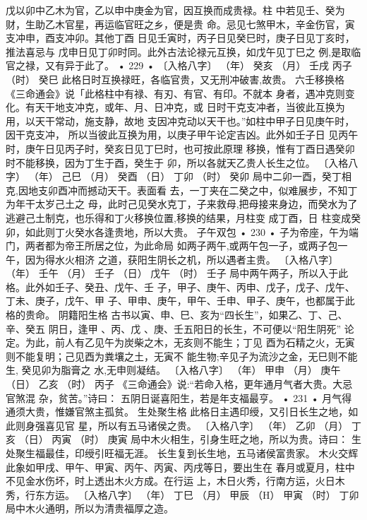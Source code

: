 戊以卯中乙木为官，乙以申中庚金为官，因互换而成贵禄。柱
中若见壬、癸为财，生助乙木官星，再运临官旺之乡，便是贵
命。忌见七煞甲木，辛金伤官，寅支冲申，酉支冲卯。其他丁酉
日见壬寅时，丙子日见癸巳时，庚子日见丁亥时，推法喜忌与
戊申日见丁卯时同。此外古法论禄元互换，如戊午见丁巳之
例,是取临官之禄，又有异于此了。
• 229 •
〔入格八字〕
（年） 癸亥
（月） 壬戌
丙子
（时） 癸巳
此格日时互换禄旺，各临官贵，又无刑冲破害,故贵。
六壬移换格
《三命通会》说「此格柱中有禄、有刃、有官、有印。不就本
身者，遇冲克则变化。有天干地支冲克，或年、月、日冲克，或
日时干克支冲者，当彼此互换为用，以天干常动，施支静，故地
支因冲克动以天干也。”如柱中甲子日见庚午时，因干克支冲，
所以当彼此互换为用，以庚子甲午论定吉凶。此外如壬子日
见丙午时，庚午日见丙子时，癸亥日见丁巳时，也可按此原理
移换，惟有丁酉日遇癸卯时不能移换，因为丁生于酉，癸生于
卯，所以各就天乙贵人长生之位。
〔入格八字）
（年） 己巳
（月） 癸酉
（日） 丁卯
（时） 癸卯
局中二卯一酉，癸丁相克,因地支卯酉冲而撼动天干。表面看
去，一丁夹在二癸之中，似难展步，不知丁为年干太岁己土之
母，此时己见癸水克丁，子来救母,把母接来身边，而癸水为了
逃避己土制克，也乐得和丁火移换位置,移换的结果，月柱变
成丁酉，日 柱变成癸卯，如此则丁火癸水各逢贵地，所以大贵。
子午双包
• 230 •
子为帝座，午为端门，两者都为帝王所居之位，为此命局
如两子两午,或两午包一子，或两子包一午，因为得水火相济
之道，获阳生阴长之机，所以遇者主贵。
〔入格八字〕
（年） 壬午
（月） 壬子
（日） 戊午
（时） 壬子
局中两午两子，所以入于此格。此外如壬子、癸丑、戊午、壬
子，甲子、庚午、丙申、戊子，戊子、戊午、丁未、庚子，戊午、甲
子、甲申、庚午，甲午、壬申、甲子、庚午，也都属于此格的贵命。
阴籍阳生格
古书以寅、申、巳、亥为“四长生”，如果乙、丁、己、辛、癸五
阴日，逢甲 、丙、戊 、庚、壬五阳日的长生，不可便以“阳生阴死”
论定。为此，前人有乙见午为炭柴之木，无亥则不能生；丁见
酉为石精之火，无寅则不能复明；己见酉为粪壤之土，无寅不
能生物;辛见子为流沙之金，无巳则不能生, 癸见卯为脂膏之
水,无申则凝结。
〔入格八字〕
（年） 甲申
（月） 庚午
（日） 乙亥
（时） 丙子
《三命通会》说:“若命入格，更年通月气者大贵。大忌官煞混
杂，贫苦。”诗曰：
五阴日诞喜阳生，若是年支福最亨。
• 231 •
月气得通须大贵，惟嫌官煞主孤贫。
生处聚生格
此格日主遇印绶，又引日长生之地，如此则身强喜见官
星，所以有五马诸侯之贵。
〔入格八字〕
（年） 乙卯
（月） 丁亥
（日） 丙寅
（时） 庚寅
局中木火相生，引身生旺之地，所以为贵。诗曰：
生处聚生福最佳，印绶引旺福无涯。
长生复到长生地，五马诸侯富贵家。
木火交辉
此象如甲戌、甲午、甲寅、丙午、丙寅、丙戌等日，要出生在
春月或夏月，柱中不见金水伤坏，时上透出木火方成。在行运
上，木日火秀，行南方运，火日木秀，行东方运。
〔入格八字〕
（年） 丁巳
（月） 甲辰
（H） 甲寅
（时） 丁卯
局中木火通明，所以为清贵福厚之造。
